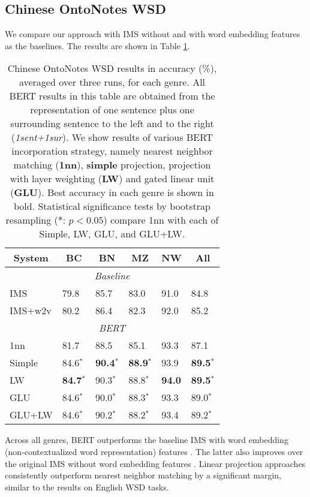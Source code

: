 \documentclass[11pt,a4paper]{article}
\begin{document}
\subsection{Chinese OntoNotes WSD}
\label{sec:results_chinese}

We compare our approach with IMS without and with word embedding features as the baselines. The results are shown in Table \ref{tab:results_chinese}.

\begin{table}[htbp]
\small
\centering
\begin{tabular}{|l|l|l|l|l|l|}
\hline
\multicolumn{1}{|c|}{\textbf{System}} & \multicolumn{1}{c|}{\textbf{BC}} & \multicolumn{1}{c|}{\textbf{BN}} & \multicolumn{1}{c|}{\textbf{MZ}} & \multicolumn{1}{c|}{\textbf{NW}} & \multicolumn{1}{c|}{\textbf{All}} \\
\hline
\multicolumn{6}{|c|}{\textit{Baseline}} \\
\hline
IMS   & 79.8  & 85.7  & 83.0  & 91.0  & 84.8  \\
IMS+w2v & 80.2  & 86.4  & 82.3  & 92.0  & 85.2  \\
\hline
\multicolumn{6}{|c|}{\textit{BERT}} \\
\hline
1nn & 81.7  & 88.5  & 85.1  & 93.3  & 87.1  \\
\hline
Simple & 84.6$^{*}$  & \textbf{90.4}$^{*}$  & \textbf{88.9}$^{*}$ & 93.9 & \textbf{89.5}$^{*}$  \\
LW & \textbf{84.7}$^{*}$ & 90.3$^{*}$ & 88.8$^{*}$ & \textbf{94.0} & \textbf{89.5}$^{*}$  \\
GLU & 84.6$^{*}$ & 90.0$^{*}$ & 88.3$^{*}$ & 93.3 & 89.0$^{*}$ \\
GLU+LW & 84.6$^{*}$ & 90.2$^{*}$ & 88.2$^{*}$ & 93.4 & 89.2$^{*}$ \\
\hline
\end{tabular}
\caption{\label{tab:results_chinese} Chinese OntoNotes WSD results in accuracy (\%), averaged over three runs, for each genre. All BERT results in this table are obtained from the representation of one sentence plus one surrounding sentence to the left and to the right (\textit{1sent+1sur}). We show results of various BERT incorporation strategy, namely nearest neighbor matching (\textbf{1nn}), \textbf{simple} projection, projection with layer weighting (\textbf{LW}) and gated linear unit (\textbf{GLU}). Best accuracy in each genre is shown in bold.
Statistical significance tests by bootstrap resampling ($*$: $p<0.05$) compare 1nn with each of Simple, LW, GLU, and GLU+LW.}
\end{table} 
Across all genres, BERT outperforms the baseline IMS with word embedding (non-contextualized word representation) features \cite{taghipour_semi-supervised_2015}. The latter also improves over the original IMS without word embedding features \cite{zhong_it_2010}. Linear projection approaches consistently outperform nearest neighbor matching by a significant margin, similar to the results on English WSD tasks.
\end{document}

